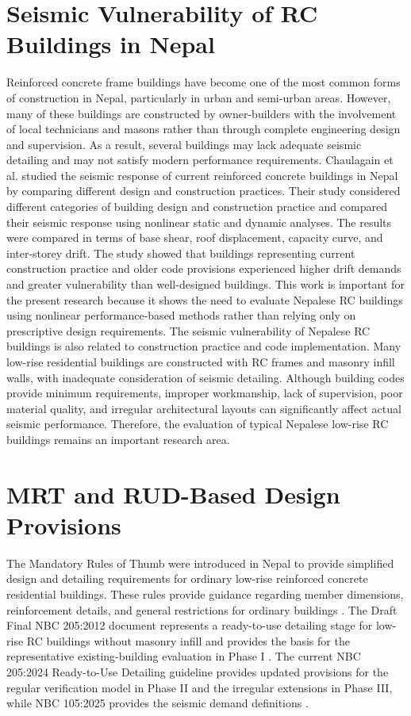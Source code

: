 \section{Seismic Vulnerability of RC Buildings in Nepal}
Reinforced concrete frame buildings have become one of the most common forms of construction in Nepal, particularly in urban and semi-urban areas. However, many of these buildings are constructed by owner-builders with the involvement of local technicians and masons rather than through complete engineering design and supervision. As a result, several buildings may lack adequate seismic detailing and may not satisfy modern performance requirements.
Chaulagain et al. \cite{chaulagain2013seismic} studied the seismic response of current reinforced concrete buildings in Nepal by comparing different design and construction practices. Their study considered different categories of building design and construction practice and compared their seismic response using nonlinear static and dynamic analyses. The results were compared in terms of base shear, roof displacement, capacity curve, and inter-storey drift. The study showed that buildings representing current construction practice and older code provisions experienced higher drift demands and greater vulnerability than well-designed buildings. This work is important for the present research because it shows the need to evaluate Nepalese RC buildings using nonlinear performance-based methods rather than relying only on prescriptive design requirements.
The seismic vulnerability of Nepalese RC buildings is also related to construction practice and code implementation. Many low-rise residential buildings are constructed with RC frames and masonry infill walls, with inadequate consideration of seismic detailing. Although building codes provide minimum requirements, improper workmanship, lack of supervision, poor material quality, and irregular architectural layouts can significantly affect actual seismic performance. Therefore, the evaluation of typical Nepalese low-rise RC buildings remains an important research area.


\section{MRT and RUD-Based Design Provisions}
The Mandatory Rules of Thumb were introduced in Nepal to provide simplified design and detailing requirements for ordinary low-rise reinforced concrete residential buildings. These rules provide guidance regarding member dimensions, reinforcement details, and general restrictions for ordinary buildings \cite{nbc205_1994}. The Draft Final NBC 205:2012 document represents a ready-to-use detailing stage for low-rise RC buildings without masonry infill and provides the basis for the representative existing-building evaluation in Phase I \cite{nbc205_2012}. The current NBC 205:2024 Ready-to-Use Detailing guideline provides updated provisions for the regular verification model in Phase II and the irregular extensions in Phase III, while NBC 105:2025 provides the seismic demand definitions \cite{nbc205_2024,nbc105_2025}.

